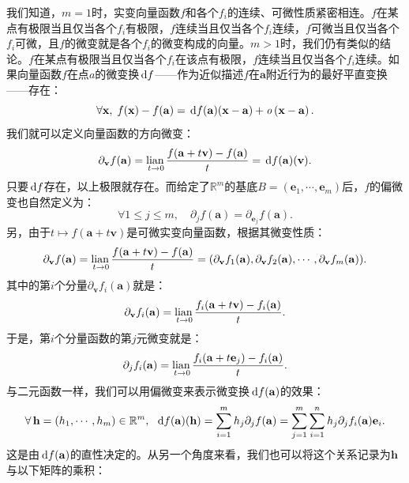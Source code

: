 \documentclass[12pt,UTF8]{ctexbook}
\begin{document}
我们知道，$m=1$时，实变向量函数$f$和各个$f_i$的连续、可微性质紧密相连。$f$在某点有极限当且仅当各个$f_i$有极限，$f$连续当且仅当各个$f_i$连续，$f$可微当且仅当各个$f_i$可微，且$f$的微变就是各个$f_i$的微变构成的向量。$m>1$时，我们仍有类似的结论。$f$在某点有极限当且仅当各个$f_i$在该点有极限，$f$连续当且仅当各个$f_i$连续。如果向量函数$f$在点$a$的微变换$\,\mathrm{d} f$——作为近似描述$f$在$\mathbf{a}$附近行为的最好平直变换——存在：
$$ \forall \mathbf{x}, \; f(\mathbf{x}) - f(\mathbf{a}) = \,\mathrm{d} f (\mathbf{a})(\mathbf{x} - \mathbf{a}) + \mathit{o}\left(\mathbf{x} - \mathbf{a}\right). $$
我们就可以定义向量函数的方向微变：
$$ \partial_{\mathbf{v}} f(\mathbf{a}) = \underset{t\to 0}{\operatorname{lian}\,} \frac{f(\mathbf{a} + t\mathbf{v}) - f(\mathbf{a})}{t} = \,\mathrm{d} f (\mathbf{a})(\mathbf{v}).$$
只要$\,\mathrm{d} f$存在，以上极限就存在。而给定了$\mathbb{R}^m$的基底$B=(\mathbf{e}_1,\cdots,\mathbf{e}_m)$后，$f$的偏微变也自然定义为：
$$ \forall 1\leqslant j\leqslant m, \quad\partial_j f(\mathbf{a}) = \partial_{\mathbf{e}_j} f(\mathbf{a}). $$
另，由于$t\mapsto f(\mathbf{a} + t\mathbf{v})$是可微实变向量函数，根据其微变性质：
$$ \partial_{\mathbf{v}} f(\mathbf{a}) = \underset{t\to 0}{\operatorname{lian}\,} \frac{f(\mathbf{a} + t\mathbf{v}) - f(\mathbf{a})}{t} = (\partial_{\mathbf{v}} f_1(\mathbf{a}), \partial_{\mathbf{v}} f_2(\mathbf{a}), \cdots, \partial_{\mathbf{v}} f_m(\mathbf{a})).$$
其中的第$i$个分量$\partial_{\mathbf{v}} f_i(\mathbf{a})$就是：
$$ \partial_{\mathbf{v}} f_i(\mathbf{a}) = \underset{t\to 0}{\operatorname{lian}\,} \frac{f_i(\mathbf{a} + t\mathbf{v}) - f_i(\mathbf{a})}{t}. $$
于是，第$i$个分量函数的第$j$元微变就是：
$$ \partial_{j} f_i(\mathbf{a}) = \underset{t\to 0}{\operatorname{lian}\,} \frac{f_i(\mathbf{a} + t\mathbf{e}_j) - f_i(\mathbf{a})}{t}. $$
与二元函数一样，我们可以用偏微变来表示微变换$\,\mathrm{d} f (\mathbf{a})$的效果：
$$ \forall\, \mathbf{h} = (h_1,\cdots, h_m) \in\mathbb{R}^m,\,\,\, \,\mathrm{d} f (\mathbf{a})(\mathbf{h}) = \sum_{i=1}^m h_j\partial_{j} f(\mathbf{a}) = \sum_{j=1}^m \sum_{i=1}^n h_j\partial_{j} f_i(\mathbf{a})\mathbf{e}_i.  $$
这是由$\,\mathrm{d} f (\mathbf{a})$的直性决定的。从另一个角度来看，我们也可以将这个关系记录为$\mathbf{h}$与以下矩阵的乘积：
\end{document}
